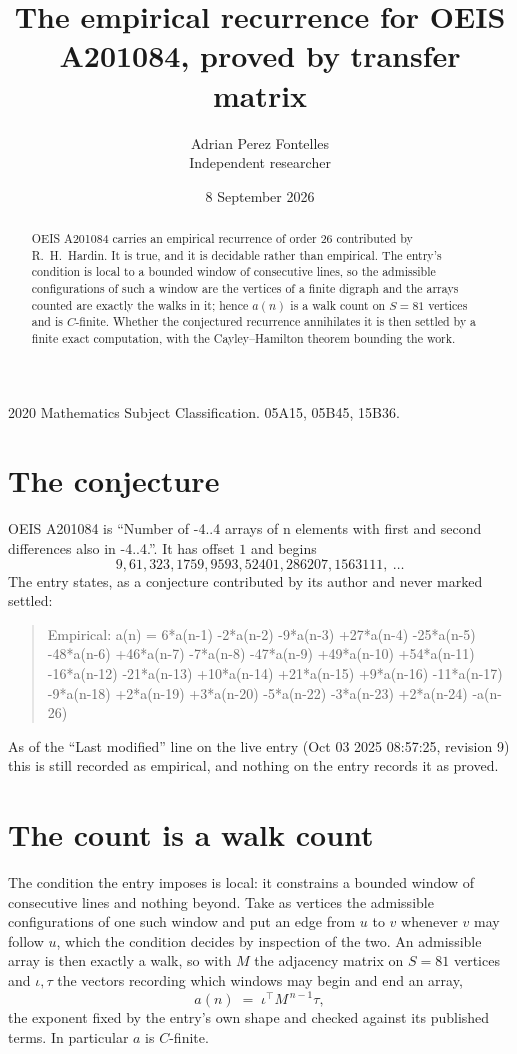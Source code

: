 \documentclass[11pt,a4paper]{article}
\title{The empirical recurrence for OEIS A201084, proved by transfer matrix}
\author{Adrian Perez Fontelles\\ \small Independent researcher}
\date{8 September 2026}
\theoremstyle{plain}
\theoremstyle{definition}
\begin{document}
\maketitle

\begin{abstract}
OEIS A201084 carries an empirical recurrence of order $26$ contributed by R.~H.~Hardin. It is
true, and it is decidable rather than empirical. The entry's condition is local to a bounded window of consecutive lines, so
the admissible configurations of such a window are the vertices of a finite digraph and the
arrays counted are exactly the walks in it; hence $a(n)$ is a walk count on $S=81$ vertices
and is $C$-finite. Whether the conjectured recurrence annihilates it is then settled by a
finite exact computation, with the Cayley--Hamilton theorem bounding the work.
\end{abstract}

\noindent\small 2020 Mathematics Subject Classification. 05A15, 05B45, 15B36.\normalsize

\section{The conjecture}

OEIS A201084 is ``Number of -4..4 arrays of n elements with first and second differences also in -4..4.''. It has offset $1$ and begins
\[
9, 61, 323, 1759, 9593, 52401, 286207, 1563111,\ \dots
\]
The entry states, as a conjecture contributed by its author and never marked settled:
\begin{quote}
Empirical: a(n) = 6*a(n-1) -2*a(n-2) -9*a(n-3) +27*a(n-4) -25*a(n-5) -48*a(n-6) +46*a(n-7) -7*a(n-8) -47*a(n-9) +49*a(n-10) +54*a(n-11) -16*a(n-12) -21*a(n-13) +10*a(n-14) +21*a(n-15) +9*a(n-16) -11*a(n-17) -9*a(n-18) +2*a(n-19) +3*a(n-20) -5*a(n-22) -3*a(n-23) +2*a(n-24) -a(n-26)
\end{quote}
As of the ``Last modified'' line on the live entry (Oct 03 2025 08:57:25, revision 9) this is still
recorded as empirical, and nothing on the entry records it as proved.

\section{The count is a walk count}

The condition the entry imposes is local: it constrains a bounded window of consecutive lines and nothing beyond. Take as
vertices the admissible configurations of one such window and put an edge from $u$ to $v$
whenever $v$ may follow $u$, which the condition decides by inspection of the two. An
admissible array is then exactly a walk, so with $M$ the adjacency matrix on $S=81$ vertices
and $\iota,\tau$ the vectors recording which windows may begin and end an array,
\[
a(n)\;=\;\iota^{\!\top}M^{\,n-1}\tau ,
\]
the exponent fixed by the entry's own shape and checked against its published terms. In
particular $a$ is $C$-finite.
\end{document}
